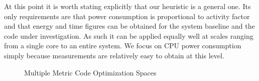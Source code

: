 At this point it is worth stating explicitly that our heuristic is a general one. Its only requirements are that power consumption is proportional to activity factor and that energy and time figures can be obtained for the system baseline and the code under investigation. As such it can be applied equally well at scales ranging from a single core to an entire system. We focus on CPU power consumption simply because measurements are relatively easy to obtain at this level.

\begin{figure}
\centering

\caption{Multiple Metric Code Optimization Spaces}
\label{fig:multimetric-technique}
\end{figure}
